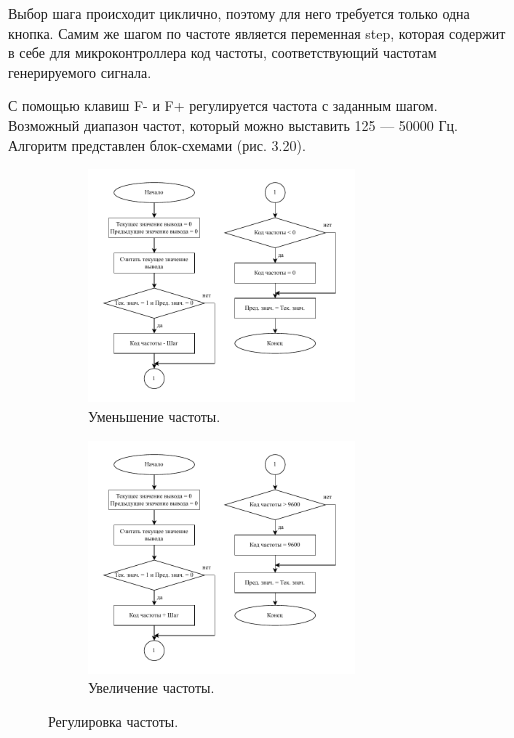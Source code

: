 	
	Выбор шага происходит циклично, поэтому для него требуется только одна кнопка. Самим же шагом по частоте является переменная step, которая содержит в себе для микроконтроллера код частоты, соответствующий частотам генерируемого сигнала.
	
	С помощью клавиш F- и F+ регулируется частота с заданным шагом. Возможный диапазон частот, который можно выставить 125 --- 50000 Гц. Алгоритм представлен блок-схемами (рис. 3.20).
	
	\begin{figure}[H]
     \begin{subfigure}[H]{1\textwidth}
         \centering
         \includegraphics[width=0.775\textwidth]{../image/minus_freq.pdf}
         \caption{Уменьшение частоты.}
     \end{subfigure}
     \hfill
     \begin{subfigure}[H]{1\textwidth}
         \centering
         \includegraphics[width=0.775\textwidth]{../image/plus_freq.pdf}
         \caption{Увеличение частоты.}
     \end{subfigure}
        \caption{Регулировка частоты.}
	\end{figure}
	
